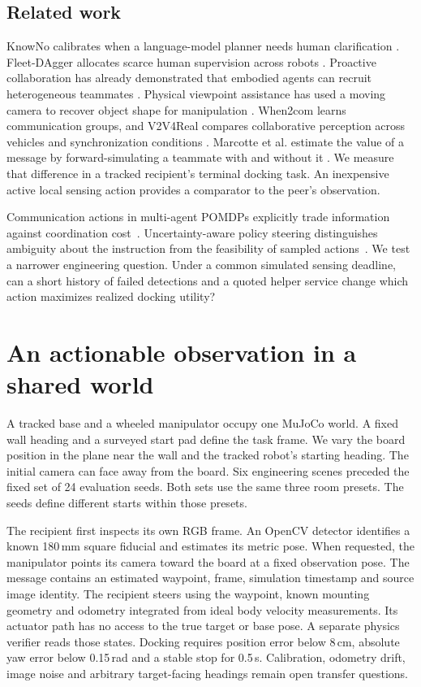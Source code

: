 \documentclass[conference]{IEEEtran}
\begin{document}
\subsection{Related work}
KnowNo calibrates when a language-model planner needs human clarification \cite{ren}. Fleet-DAgger allocates scarce human supervision across robots \cite{hoque}. Proactive collaboration has already demonstrated that embodied agents can recruit heterogeneous teammates \cite{recruitment}. Physical viewpoint assistance has used a moving camera to recover object shape for manipulation \cite{viewpoint}. When2com learns communication groups, and V2V4Real compares collaborative perception across vehicles and synchronization conditions \cite{liu,xu}. Marcotte et al. estimate the value of a message by forward-simulating a teammate with and without it \cite{marcotte}. We measure that difference in a tracked recipient's terminal docking task. An inexpensive active local sensing action provides a comparator to the peer's observation.

Communication actions in multi-agent POMDPs explicitly trade information against coordination cost~\cite{askpomdp}. Uncertainty-aware policy steering distinguishes ambiguity about the instruction from the feasibility of sampled actions~\cite{ups}. We test a narrower engineering question. Under a common simulated sensing deadline, can a short history of failed detections and a quoted helper service change which action maximizes realized docking utility?

\section{An actionable observation in a shared world}
A tracked base and a wheeled manipulator occupy one MuJoCo world. A fixed wall heading and a surveyed start pad define the task frame. We vary the board position in the plane near the wall and the tracked robot's starting heading. The initial camera can face away from the board. Six engineering scenes preceded the fixed set of 24 evaluation seeds. Both sets use the same three room presets. The seeds define different starts within those presets.

The recipient first inspects its own RGB frame. An OpenCV detector identifies a known 180\,mm square fiducial and estimates its metric pose. When requested, the manipulator points its camera toward the board at a fixed observation pose. The message contains an estimated waypoint, frame, simulation timestamp and source image identity. The recipient steers using the waypoint, known mounting geometry and odometry integrated from ideal body velocity measurements. Its actuator path has no access to the true target or base pose. A separate physics verifier reads those states. Docking requires position error below 8\,cm, absolute yaw error below 0.15\,rad and a stable stop for 0.5\,s. Calibration, odometry drift, image noise and arbitrary target-facing headings remain open transfer questions.
\end{document}
